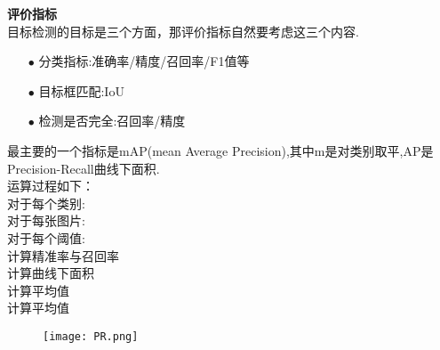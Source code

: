 \begin{frame}
    \noindent\large\textbf{评价指标}\\
    \vspace{1em}
    目标检测的目标是三个方面，那评价指标自然要考虑这三个内容.\\
    \vspace{1em}
    \begin{itemize}
        \item[$ \bullet $]分类指标:准确率/精度/召回率/F1值等
        \item[$ \bullet $]目标框匹配:IoU
        \item[$ \bullet $] 检测是否完全:召回率/精度
    \end{itemize}
    \vspace{1em}
    最主要的一个指标是mAP(mean Average Precision),其中m是对类别取平,AP是Precision-Recall曲线下面积.\\
    运算过程如下：\\
    对于每个类别:\\
    \qquad 对于每张图片:\\
    \qquad\qquad 对于每个阈值:\\
    \qquad\qquad\qquad 计算精准率与召回率\\
    \qquad\qquad 计算曲线下面积\\
    \qquad 计算平均值\\
    计算平均值
    \vspace{-3.6cm}
    \begin{figure}
        \hspace{6cm}
        \texttt{[image: PR.png]}
    \end{figure}


\end{frame}
